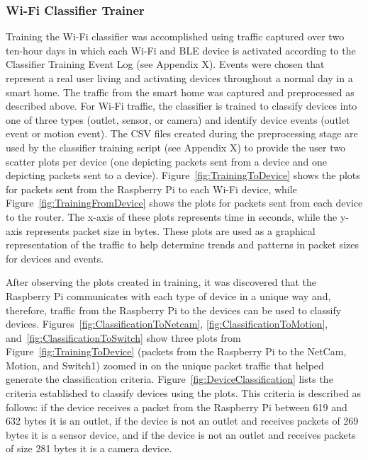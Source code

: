 \documentclass[12pt,letterpaper,oneside]{book}
\begin{document}
			\subsubsection{Wi-Fi Classifier Trainer}
			Training the Wi-Fi classifier was accomplished using traffic captured over two ten-hour days in which each Wi-Fi and \ac{BLE} device is activated according to the Classifier Training Event Log (see Appendix X). Events were chosen that represent a real user living and activating devices throughout a normal day in a smart home. The traffic from the smart home was captured and preprocessed as described above. For Wi-Fi traffic, the classifier is trained to classify devices into one of three types (outlet, sensor, or camera) and identify device events (outlet event or motion event). The \ac{CSV} files created during the preprocessing stage are used by the classifier training script (see Appendix X) to provide the user two scatter plots per device (one depicting packets sent from a device and one depicting packets sent to a device). Figure~\ref{fig:TrainingToDevice} shows the plots for packets sent from the Raspberry Pi to each Wi-Fi device, while Figure~\ref{fig:TrainingFromDevice} shows the plots for packets sent from each device to the router. The x-axis of these plots represents time in seconds, while the y-axis represents packet size in bytes. These plots are used as a graphical representation of the traffic to help determine trends and patterns in packet sizes for devices and events. 
			
			\figTrainingToDevice
			\figTrainingFromDevice
			
			After observing the plots created in training, it was discovered that the Raspberry Pi communicates with each type of device in a unique way and, therefore, traffic from the Raspberry Pi to the devices can be used to classify devices. Figures~\ref{fig:ClassificationToNetcam}, \ref{fig:ClassificationToMotion}, and~\ref{fig:ClassificationToSwitch} show three plots from Figure~\ref{fig:TrainingToDevice} (packets from the Raspberry Pi to the NetCam, Motion, and Switch1) zoomed in on the unique packet traffic that helped generate the classification criteria.  Figure~\ref{fig:DeviceClassification} lists the criteria established to classify devices using the plots.  This criteria is described as follows: if the device receives a packet from the Raspberry Pi between 619 and 632 bytes it is an outlet, if the device is not an outlet and receives packets of 269 bytes it is a sensor device, and if the device is not an outlet and receives packets of size 281 bytes it is a camera device. 
			
\end{document}
